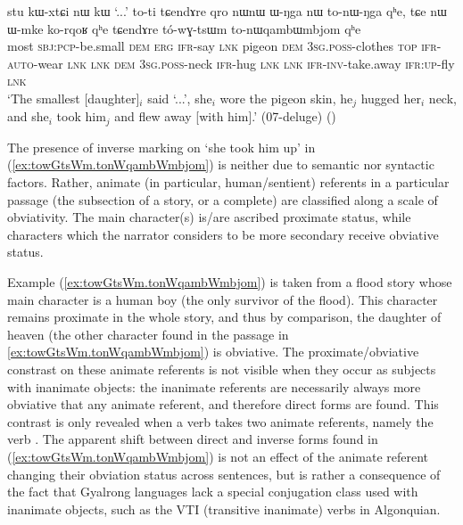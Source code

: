 \begin{exe}
\ex \label{ex:towGtsWm.tonWqambWmbjom} 
\gll stu kɯ-xtɕi nɯ kɯ `...' to-ti tɕendɤre qro nɯnɯ ɯ-ŋga nɯ to-nɯ-ŋga qʰe, tɕe nɯ ɯ-mke ko-rqoʁ qʰe tɕendɤre tó-wɣ-tsɯm to-nɯqambɯmbjom qʰe \\
most \textsc{sbj}:\textsc{pcp}-be.small \textsc{dem} \textsc{erg} { } \textsc{ifr}-say \textsc{lnk} pigeon \textsc{dem} \textsc{3sg}.\textsc{poss}-clothes \textsc{top} \textsc{ifr}-\textsc{auto}-wear \textsc{lnk} \textsc{lnk} \textsc{dem} \textsc{3sg}.\textsc{poss}-neck \textsc{ifr}-hug \textsc{lnk} \textsc{lnk} \textsc{ifr}-\textsc{inv}-take.away \textsc{ifr}:\textsc{up}-fly \textsc{lnk} \\
\glt `The smallest [daughter]$_i$ said `...', she$_i$ wore the pigeon skin, he$_j$ hugged her$_i$ neck, and she$_i$ took him$_j$ and flew away [with him].' (07-deluge)
()
\end{exe}

The presence of inverse marking on  `she took him up' in (\ref{ex:towGtsWm.tonWqambWmbjom}) is neither due to semantic nor syntactic factors. Rather, animate (in particular, human/sentient) referents in a particular passage (the subsection of a story, or a complete) are classified along a scale of obviativity. The main character(s) is/are ascribed proximate status, while characters which the narrator considers to be more secondary receive obviative status. 

Example (\ref{ex:towGtsWm.tonWqambWmbjom}) is taken from a flood story whose main character is a human boy (the only survivor of the flood). This character remains proximate in the whole story, and thus by comparison, the daughter of heaven (the other character found in the passage in \ref{ex:towGtsWm.tonWqambWmbjom}) is obviative. The proximate/obviative constrast on these animate referents is not visible when they occur as subjects with inanimate objects: the inanimate referents are necessarily always more obviative that any animate referent, and therefore direct forms are found. This contrast is only revealed when a verb takes two animate referents, namely the verb . The apparent shift between direct and inverse forms found in (\ref{ex:towGtsWm.tonWqambWmbjom}) is not an effect of the animate referent changing their obviation status across sentences, but is rather a consequence of the fact that Gyalrong languages lack a special conjugation class used with inanimate objects, such as the VTI (transitive inanimate) verbs in Algonquian.

